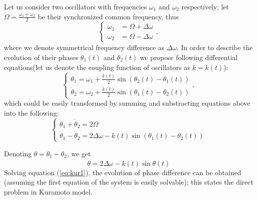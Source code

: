 \documentclass{ws-ijbc}
\begin{document}
Let us consider two oscillators with frequencies $\omega_{1}$ and
$\omega_{2}$ respectively; let $\Omega=\frac{\omega_{1}+\omega_{2}}{2}$
be their synchronized common frequency, thus 
\[
\begin{cases}
\omega_{1} & =\Omega+\Delta\omega\\
\omega_{2} & =\Omega-\Delta\omega
\end{cases},
\]
where we denote symmetrical frequency difference as $\Delta\omega$.
In order to describe the evolution of their phases $\theta_{1}(t)$
and $\theta_{2}(t)$ we propose following differential equations(let
us denote the coupling function of oscillators as $k=k(t)$):
\[
\begin{cases}
\dot{\theta}_{1}=\omega_{1}+\frac{k(t)}{2}\sin\left(\theta_{2}(t)-\theta_{1}(t)\right)\\
\dot{\theta}_{2}=\omega_{2}+\frac{k(t)}{2}\sin\left(\theta_{1}(t)-\theta_{2}(t)\right)
\end{cases},
\]
which could be easily transformed by summing and substracting equations
above into the following:
\[
\begin{cases}
\dot{\theta}_{1}+\dot{\theta}_{2}=2\Omega\\
\dot{\theta}_{1}-\dot{\theta}_{2}=2\Delta\omega-k(t)\sin\left(\theta_{1}(t)-\theta_{2}(t)\right)
\end{cases}
\]

Denoting $\theta=\theta_{1}-\theta_{2}$, we get 
\begin{equation}
\dot{\theta}=2\Delta\omega-k(t)\sin\theta(t)\label{eq:kur1}
\end{equation}
Solving equation (\ref{eq:kur1}), the evolution of phase difference
can be obtained (assuming the first equation of the system is easily
solvable); this states the direct problem in Kuramoto model.
\end{document}
